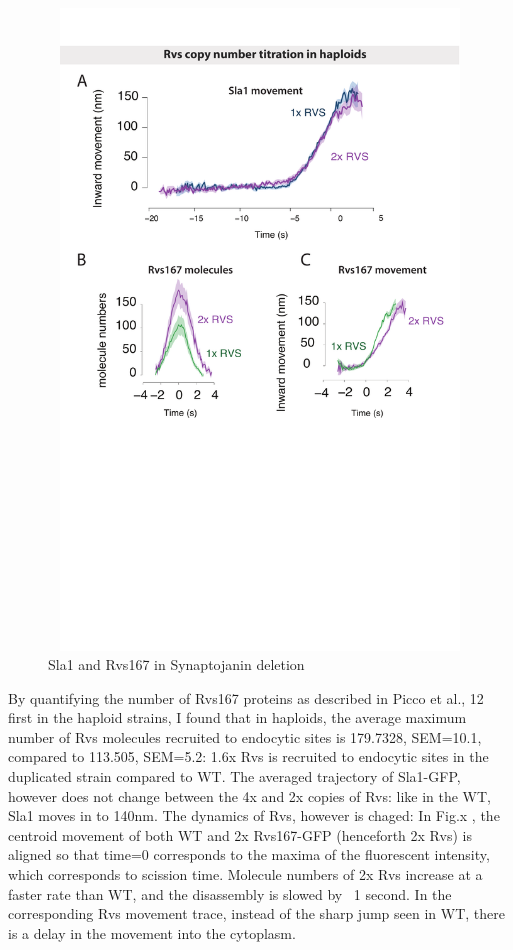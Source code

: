 		\begin{figure}
		\centering
		\includegraphics[width=17cm,height=17cm,keepaspectratio]{figures/results_final/rvs_haploid}
		\caption{Sla1 and Rvs167 in Synaptojanin deletion \label{fig5}}
	\end{figure}	

	\vspace{5mm}
	By quantifying the number of Rvs167 proteins as described in Picco et al., 12  first in the haploid strains, I found that in haploids, the average maximum number of Rvs molecules recruited to endocytic sites is 179.7328, SEM=10.1, compared to 113.505, SEM=5.2:  1.6x Rvs is recruited to endocytic sites in the duplicated strain compared to WT. The averaged trajectory of Sla1-GFP, however does not change between the 4x and 2x copies of Rvs: like in the WT, Sla1 moves in to 140nm. The dynamics of Rvs, however is chaged: In Fig.x , the centroid movement of both WT and 2x Rvs167-GFP (henceforth 2x Rvs) is aligned so that time=0 corresponds to the maxima of the fluorescent intensity, which corresponds to scission time. Molecule numbers of 2x Rvs increase at a faster rate than WT, and the disassembly is slowed by ~1 second. In the corresponding Rvs movement trace, instead of the sharp jump seen in WT, there is a delay in the movement into the cytoplasm.


